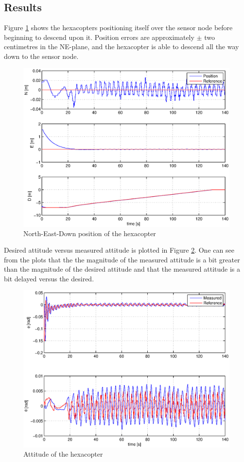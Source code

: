\subsection{Results}
Figure \ref{posSITL} shows the hexacopters positioning itself over the sensor node before beginning to descend upon it. Position errors are approximately $\pm$ two centimetres in the NE-plane, and the hexacopter is able to descend all the way down to the sensor node.  
\begin{figure}[H]
\centering
\includegraphics[width = 12cm]{fig/plots/sitl/posNoDisturbance.eps}
\caption{North-East-Down position of the hexacopter}
\label{posSITL}
\end{figure}\noindent
Desired attitude versus measured attitude is plotted in Figure \ref{attitudeSITL}. One can see from the plots that the the magnitude of the measured attitude is a bit greater than the magnitude of the desired attitude and that the measured attitude is a bit delayed versus the desired.
\begin{figure}[H]
\centering
\includegraphics[width = 12cm]{fig/plots/sitl/attitudeNoDisturbance.eps}
\caption{Attitude of the hexacopter}
\label{attitudeSITL}
\end{figure}
